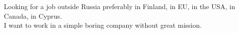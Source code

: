 \documentclass[letter,10pt]{article}
\begin{document}
Looking for a job outside Russia preferably in Finland, in EU, in the USA, in Canada, in Cyprus.\\
I want to work in a simple boring company without great mission.
\end{document}
